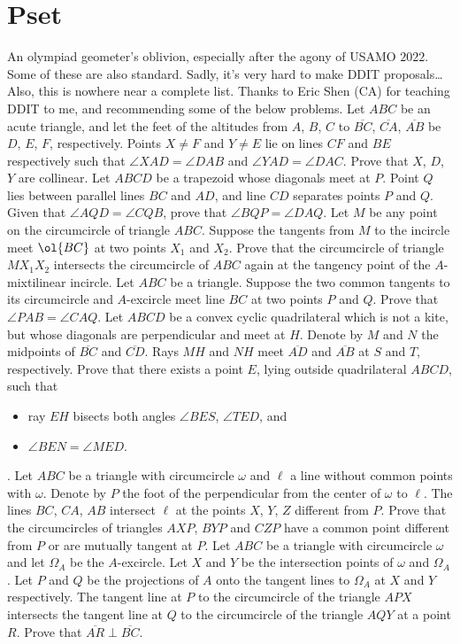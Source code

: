 \documentclass[labelsBySect]{seto}
\begin{document}
\section{Pset}
An olympiad geometer's oblivion, especially after the agony of USAMO $2022$. Some of these are also standard. Sadly, it's very hard to make DDIT proposals\dots\\[4pt]
Also, this is nowhere near a complete list. Thanks to Eric Shen (CA) for teaching DDIT to me, and recommending some of the below problems.
\exercise[CAMO 2021/1]Let $ABC$ be an acute triangle, and let the feet of the altitudes from $A$, $B$, $C$ to $\overline{BC}$, $\overline{CA}$, $\overline{AB}$ be $D$, $E$, $F$, respectively. Points $X\ne F$ and $Y\ne E$ lie on lines $CF$ and $BE$ respectively such that $\angle XAD=\angle DAB$ and $\angle YAD=\angle DAC$. Prove that $X$, $D$, $Y$ are collinear.
\exercise[Shortlist 2007 G3]Let $ABCD$ be a trapezoid whose diagonals meet at $P$. Point $Q$ lies between parallel lines $BC$ and $AD$, and line $CD$ separates points $P$ and $Q$. Given that $\angle AQD = \angle CQB$, prove that $\angle BQP = \angle DAQ$. 
 Let $M$ be any point on the circumcircle of triangle $ABC$. Suppose the tangents from $M$ to the incircle meet $\ol{BC}$ at two points $X_1$ and $X_2$.  Prove that the circumcircle of triangle $MX_1X_2$ intersects the circumcircle of $ABC$ again at the tangency point of the $A$-mixtilinear incircle.
\exercise[Serbia 2017/6] Let $ABC$ be a triangle. Suppose the two common tangents to its circumcircle and $A$-excircle meet line $BC$ at two points $P$ and $Q$. Prove that $\angle PAB = \angle CAQ$.
 Let $ABCD$ be a convex cyclic quadrilateral which is not a kite, but whose diagonals are perpendicular and meet at $H$. Denote by $M$ and $N$ the midpoints of $\overline{BC}$ and $\overline{CD}$. Rays $MH$ and $NH$ meet $\overline{AD}$ and $\overline{AB}$ at $S$ and $T$, respectively. Prove that there exists a point $E$, lying outside quadrilateral $ABCD$, such that
\begin{itemize}
\item ray $EH$ bisects both angles $\angle BES$, $\angle TED$, and
\item $\angle BEN = \angle MED$.
\end{itemize}.
\exercise[Shortlist 2012 G8] Let $ABC$ be a triangle with circumcircle $\omega$ and $\ell$ a line without common points with $\omega$. Denote by $P$ the foot of the perpendicular from the center of $\omega$ to $\ell$. The lines $BC$, $CA$, $AB$ intersect $\ell$ at the points $X$, $Y$, $Z$ different from $P$. Prove that the circumcircles of triangles $AXP$, $BYP$ and $CZP$ have a common point different from $P$ or are mutually tangent at $P$. 
 Let $ABC$ be a triangle with circumcircle $\omega$ and let $\Omega_A$ be the $A$-excircle. Let $X$ and $Y$ be the intersection points of $\omega$ and $\Omega_A$. Let $P$ and $Q$ be the projections of $A$ onto the tangent lines to $\Omega_A$ at $X$ and $Y$ respectively. The tangent line at $P$ to the circumcircle of the triangle $APX$ intersects the tangent line at $Q$ to the circumcircle of the triangle $AQY$ at a point $R$. Prove that $\overline{AR} \perp \overline{BC}$.
\end{document}
